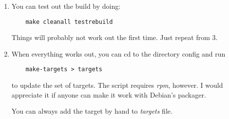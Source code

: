 \documentclass{article}
\begin{document}
\begin{enumerate}
   \item  You can test out the build by doing:
   
\begin{verbatim} 
    make cleanall testrebuild
\end{verbatim} 
    
        Things will probably not work out the first time.  Just repeat from 3.
    
   \item  When everything works out, you can cd to the directory config and run
    
\begin{verbatim} 
    make-targets > targets
\end{verbatim}
        \noindent to update the set of targets.   
         The script requires {\em rpm}, however.
        I would appreciate it if anyone can make it work with Debian's 
        packager.
    
        You can always add the target by hand to {\em targets} file.
\end{enumerate}
\end{document}
